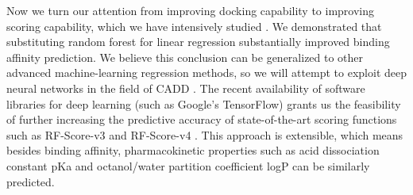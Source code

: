 \documentclass[a4paper,12pt]{article}
\begin{document}


Now we turn our attention from improving docking capability to improving scoring capability, which we have intensively studied \citep{1432,1647,1796,1433,1795,1797,1434,1663}. We demonstrated that substituting random forest for linear regression substantially improved binding affinity prediction. We believe this conclusion can be generalized to other advanced machine-learning regression methods, so we will attempt to exploit deep neural networks in the field of CADD \citep{1810}. The recent availability of software libraries for deep learning (such as Google's TensorFlow) grants us the feasibility of further increasing the predictive accuracy of state-of-the-art scoring functions such as RF-Score-v3 \citep{1647} and RF-Score-v4 \citep{1795}. This approach is extensible, which means besides binding affinity, pharmacokinetic properties such as acid dissociation constant pKa and octanol/water partition coefficient logP can be similarly predicted.


\end{document}
